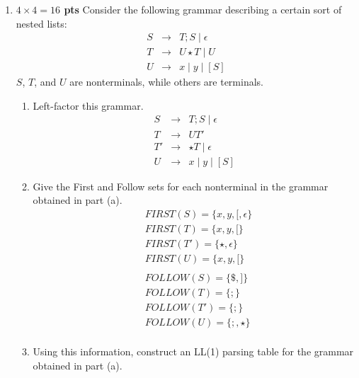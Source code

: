 \documentclass[10pt]{article}
\newcommand {\pts}[1]{{\bf #1 pts}}
\begin{document}
\begin{enumerate}
\newpage
\item \pts{$4\times 4 =16$} Consider the following grammar describing a certain sort of nested lists:
\[\begin{array}{cll}
S & \rightarrow & T;S \mid \epsilon \\
T & \rightarrow & U\star T \mid U \\
U & \rightarrow & x\mid y\mid [S]
\end{array}\]
$S$, $T$, and $U$ are nonterminals, while others are terminals.
\begin{enumerate}
  \item Left-factor this grammar.
		\[\begin{array}{cll}
		S & \rightarrow & T;S \mid \epsilon \\
		T & \rightarrow & UT'  \\
		T' & \rightarrow & \star T \mid \epsilon\\
		U & \rightarrow & x\mid y\mid [S]
		\end{array}\]
  \item Give the First and Follow sets for each nonterminal in the grammar obtained in part (a).
            \begin{equation*}\begin{aligned}
			& FIRST(S) = \{x, y, [, \epsilon\} \\
			& FIRST(T) = \{x, y, [\} \\
			& FIRST(T') = \{\star, \epsilon\} \\
			& FIRST(U) = \{x, y, [\} \\
			& \\
			& FOLLOW(S) = \{\$, ]\} \\
			& FOLLOW(T) = \{;\} \\
			& FOLLOW(T') = \{;\} \\
			& FOLLOW(U) = \{;, \star\} \\
            \end{aligned}\end{equation*}
  \item Using this information, construct an LL(1) parsing table for the grammar obtained in part (a).


\end{enumerate}
\end{enumerate}
\end{document}
